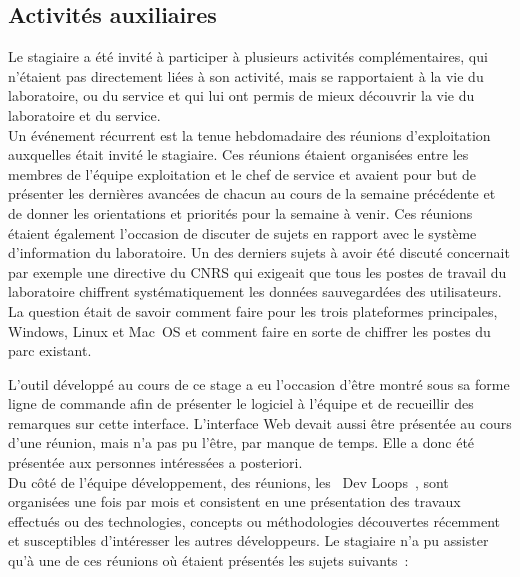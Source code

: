 \documentclass[12pt,a4paper,twoside]{report}
\begin{document}
\subsection{Activités auxiliaires}

Le stagiaire a été invité à participer à plusieurs activités complémentaires,
qui n’étaient pas directement liées à son activité, mais se rapportaient à la
vie du laboratoire, ou du service et qui lui ont permis de mieux découvrir la
vie du laboratoire et du service.\\

Un événement récurrent est la tenue hebdomadaire des réunions
d’exploitation auxquelles était invité le stagiaire. Ces réunions étaient
organisées entre les membres de l’équipe exploitation et le chef de service et
avaient pour but de présenter les dernières avancées de chacun au cours de la
semaine précédente et de donner les orientations et priorités pour la semaine à
venir. Ces réunions étaient également l’occasion de discuter de sujets en
rapport avec le système d’information du laboratoire. Un des derniers sujets à
avoir été discuté concernait par exemple une directive du CNRS qui exigeait que
tous les postes de travail du laboratoire chiffrent systématiquement les
données sauvegardées des utilisateurs. La question était de savoir comment
faire pour les trois plateformes principales, Windows, Linux et Mac~OS et
comment faire en sorte de chiffrer les postes du parc existant.

L’outil développé au cours de ce stage a eu l’occasion d’être montré sous sa
forme ligne de commande afin de présenter le logiciel à l’équipe et de
recueillir des remarques sur cette interface. L’interface Web devait aussi être
présentée au cours d’une réunion, mais n’a pas pu l’être, par manque de temps.
Elle a donc été présentée aux personnes intéressées a posteriori.\\

Du côté de l’équipe développement, des réunions, les \og~Dev Loops~\fg{},
sont organisées une fois par mois et consistent en une présentation des
travaux effectués ou des technologies, concepts ou méthodologies découvertes
récemment et susceptibles d’intéresser les autres développeurs. Le stagiaire
n’a pu assister qu’à une de ces réunions où étaient présentés les sujets
suivants~:
\end{document}
